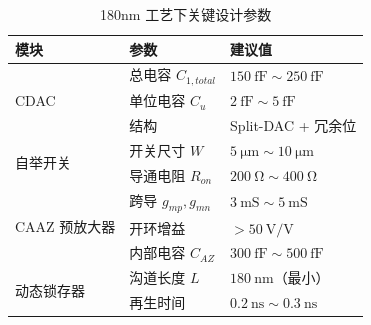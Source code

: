 \documentclass[11pt,a4paper,UTF8]{ctexart}
\begin{document}
\begin{table}[htbp]
\centering
\caption{180nm 工艺下关键设计参数}
\label{tab:design_params}
\begin{tabular}{lll}
\toprule
\textbf{模块} & \textbf{参数} & \textbf{建议值} \\
\midrule
\multirow{3}{*}{CDAC} 
    & 总电容 $C_{1,total}$ & $\SI{150}{\femto\farad} \sim \SI{250}{\femto\farad}$ \\
    & 单位电容 $C_u$ & $\SI{2}{\femto\farad} \sim \SI{5}{\femto\farad}$ \\
    & 结构 & Split-DAC + 冗余位 \\
\midrule
\multirow{2}{*}{自举开关} 
    & 开关尺寸 $W$ & $\SI{5}{\micro\meter} \sim \SI{10}{\micro\meter}$ \\
    & 导通电阻 $R_{on}$ & $\SI{200}{\ohm} \sim \SI{400}{\ohm}$ \\
\midrule
\multirow{3}{*}{CAAZ 预放大器} 
    & 跨导 $g_{mp}, g_{mn}$ & $\SI{3}{\milli\siemens} \sim \SI{5}{\milli\siemens}$ \\
    & 开环增益 & $> \SI{50}{\volt\per\volt}$ \\
    & 内部电容 $C_{AZ}$ & $\SI{300}{\femto\farad} \sim \SI{500}{\femto\farad}$ \\
\midrule
\multirow{2}{*}{动态锁存器} 
    & 沟道长度 $L$ & $\SI{180}{\nano\meter}$（最小） \\
    & 再生时间 & $\SI{0.2}{\nano\second} \sim \SI{0.3}{\nano\second}$ \\
\bottomrule
\end{tabular}
\end{table}
\end{document}
